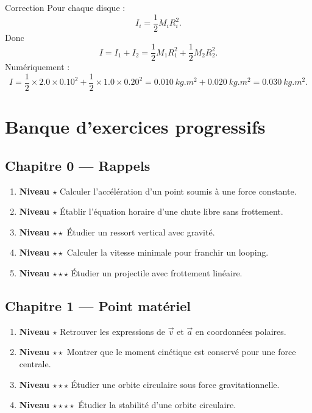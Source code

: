 \documentclass[11pt,a4paper]{article}
\newcommand{\niveau}[1]{\textbf{Niveau #1}}
\begin{document}
\begin{correctionbox}{Correction}{}
Pour chaque disque :
\[
I_i=\frac12M_iR_i^2.
\]
Donc
\[
I=I_1+I_2
=
\frac12M_1R_1^2+\frac12M_2R_2^2.
\]
Numériquement :
\[
I=\frac12\times2.0\times0.10^2
+\frac12\times1.0\times0.20^2
=\SI{0.010}{kg.m^2}+\SI{0.020}{kg.m^2}
=\SI{0.030}{kg.m^2}.
\]
\end{correctionbox}

\section{Banque d'exercices progressifs}

\subsection*{Chapitre 0 — Rappels}
\begin{enumerate}
  \item \niveau{$\star$} Calculer l'accélération d'un point soumis à une force constante.
  \item \niveau{$\star$} Établir l'équation horaire d'une chute libre sans frottement.
  \item \niveau{$\star\star$} Étudier un ressort vertical avec gravité.
  \item \niveau{$\star\star$} Calculer la vitesse minimale pour franchir un looping.
  \item \niveau{$\star\star\star$} Étudier un projectile avec frottement linéaire.
\end{enumerate}

\subsection*{Chapitre 1 — Point matériel}
\begin{enumerate}
  \item \niveau{$\star$} Retrouver les expressions de $\vec v$ et $\vec a$ en coordonnées polaires.
  \item \niveau{$\star\star$} Montrer que le moment cinétique est conservé pour une force centrale.
  \item \niveau{$\star\star\star$} Étudier une orbite circulaire sous force gravitationnelle.
  \item \niveau{$\star\star\star\star$} Étudier la stabilité d'une orbite circulaire.
\end{enumerate}
\end{document}
